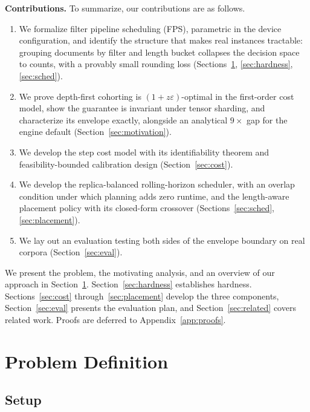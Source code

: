 \documentclass[10pt,twocolumn]{article}
\newcommand{\eps}{\varepsilon}
\begin{document}
\textbf{Contributions.} To summarize, our contributions are as follows.
\begin{enumerate}[leftmargin=*,itemsep=1pt]
\item We formalize filter pipeline scheduling (FPS), parametric in the device configuration, and identify the structure that makes real instances tractable: grouping documents by filter and length bucket collapses the decision space to counts, with a provably small rounding loss (Sections~\ref{sec:problem}, \ref{sec:hardness}, \ref{sec:sched}).
\item We prove depth-first cohorting is $(1+z\eps)$-optimal in the first-order cost model, show the guarantee is invariant under tensor sharding, and characterize its envelope exactly, alongside an analytical $9\times$ gap for the engine default (Section~\ref{sec:motivation}).
\item We develop the step cost model with its identifiability theorem and feasibility-bounded calibration design (Section~\ref{sec:cost}).
\item We develop the replica-balanced rolling-horizon scheduler, with an overlap condition under which planning adds zero runtime, and the length-aware placement policy with its closed-form crossover (Sections~\ref{sec:sched}, \ref{sec:placement}).
\item We lay out an evaluation testing both sides of the envelope boundary on real corpora (Section~\ref{sec:eval}).
\end{enumerate}

We present the problem, the motivating analysis, and an overview of our approach in Section~\ref{sec:problem}. Section~\ref{sec:hardness} establishes hardness. Sections~\ref{sec:cost} through~\ref{sec:placement} develop the three components, Section~\ref{sec:eval} presents the evaluation plan, and Section~\ref{sec:related} covers related work. Proofs are deferred to Appendix~\ref{app:proofs}.

\section{Problem Definition}
\label{sec:problem}

\subsection{Setup}
\label{sec:setup}
\end{document}
